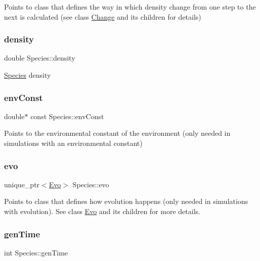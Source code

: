 Points to class that defines the way in which density change from one step to the next is calculated (see class \hyperlink{classChange}{Change} and its children for details) \mbox{\label{classSpecies_a2d5f0b6b799578963257416fa5ad0630}} 
\subsubsection{\texorpdfstring{density}{density}}
{\footnotesize\ttfamily double Species\+::density\hspace{0.3cm}{\ttfamily [protected]}}

\hyperlink{classSpecies}{Species} density \mbox{\label{classSpecies_a95c7dd87e88653b245d52400b4134b68}} 
\subsubsection{\texorpdfstring{env\+Const}{envConst}}
{\footnotesize\ttfamily double$\ast$ const Species\+::env\+Const\hspace{0.3cm}{\ttfamily [protected]}}

Points to the environmental constant of the environment (only needed in simulations with an environmental constant) \mbox{\label{classSpecies_a25d6cad0391b8d98c986e17bcb5c2586}} 
\subsubsection{\texorpdfstring{evo}{evo}}
{\footnotesize\ttfamily unique\+\_\+ptr$<$\hyperlink{classEvo}{Evo}$>$ Species\+::evo\hspace{0.3cm}{\ttfamily [protected]}}

Points to class that defines how evolution happens (only needed in simulations with evolution). See class \hyperlink{classEvo}{Evo} and its children for more details. \mbox{\label{classSpecies_a17c9e5d56923d9800bd9b2cfacbcba8b}} 
\subsubsection{\texorpdfstring{gen\+Time}{genTime}}
{\footnotesize\ttfamily int Species\+::gen\+Time\hspace{0.3cm}{\ttfamily [protected]}}

